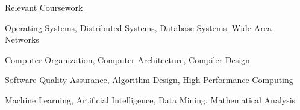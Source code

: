 \vspace*{0pt}Relevant Coursework
\begin{rSubsection}{}{}{}{}
    \item Operating Systems, Distributed Systems, Database Systems, Wide Area Networks
    \item Computer Organization, Computer Architecture, Compiler Design
    \item Software Quality Assurance, Algorithm Design, High Performance Computing
    \item Machine Learning, Artificial Intelligence, Data Mining, Mathematical Analysis
\end{rSubsection}
